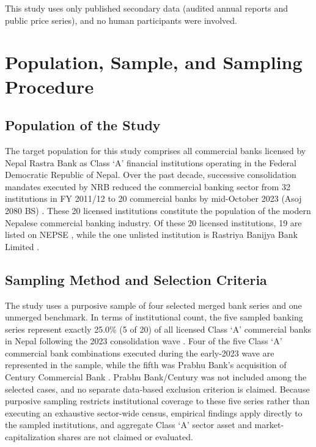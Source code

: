 This study uses only published secondary data (audited annual reports and public price series), and no human participants were involved.

\section{Population, Sample, and Sampling Procedure}

\subsection{Population of the Study}
The target population for this study comprises all commercial banks licensed by Nepal Rastra Bank as Class `A' financial institutions operating in the Federal Democratic Republic of Nepal. Over the past decade, successive consolidation mandates executed by NRB reduced the commercial banking sector from 32 institutions in FY 2011/12 \citep{nrb2013stats} to 20 commercial banks by mid-October 2023 (Asoj 2080 BS) \citep{nrb2023list}. These 20 licensed institutions constitute the population of the modern Nepalese commercial banking industry. Of these 20 licensed institutions, 19 are listed on NEPSE \citep{bhandari2026}, while the one unlisted institution is Rastriya Banijya Bank Limited \citep{nrb2023list}.

\subsection{Sampling Method and Selection Criteria}
The study uses a purposive sample of four selected merged bank series and one unmerged benchmark. In terms of institutional count, the five sampled banking series represent exactly 25.0\% (5 of 20) of all licensed Class `A' commercial banks in Nepal following the 2023 consolidation wave \citep{nrb2023list}. Four of the five Class `A' commercial bank combinations executed during the early-2023 wave are represented in the sample, while the fifth was Prabhu Bank's acquisition of Century Commercial Bank \citep{nrb2023bsr}. Prabhu Bank/Century was not included among the selected cases, and no separate data-based exclusion criterion is claimed. Because purposive sampling restricts institutional coverage to these five series rather than executing an exhaustive sector-wide census, empirical findings apply directly to the sampled institutions, and aggregate Class `A' sector asset and market-capitalization shares are not claimed or evaluated.

